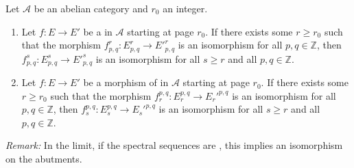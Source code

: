 \begin{lemma} \label{lemma:mapping_lemma_for_spectral_sequences_in_abelian_categories}
Let $\mathcal{A}$ be an abelian category and $r_0$ an integer.
\begin{enumerate}
    \item Let $f: E \to E'$ be a  in $\mathcal{A}$ starting at page $r_0$. If there exists some $r \ge r_0$ such that the morphism $f^r_{p,q}: E^r_{p,q} \to E'^r_{p,q}$ is an isomorphism for all $p, q \in \mathbb{Z}$, then $f^s_{p,q}: E^s_{p,q} \to E'^s_{p,q}$ is an isomorphism for all $s \ge r$ and all $p, q \in \mathbb{Z}$.
    \item Let $f: E \to E'$ be a morphism of  in $\mathcal{A}$ starting at page $r_0$. If there exists some $r \ge r_0$ such that the morphism $f_r^{p,q}: E_r^{p,q} \to E_r'^{p,q}$ is an isomorphism for all $p, q \in \mathbb{Z}$, then $f_s^{p,q}: E_s^{p,q} \to E_s'^{p,q}$ is an isomorphism for all $s \ge r$ and all $p, q \in \mathbb{Z}$.
\end{enumerate}
\textit{Remark:} In the limit, if the spectral sequences are , this implies an isomorphism on the abutments.
\end{lemma}